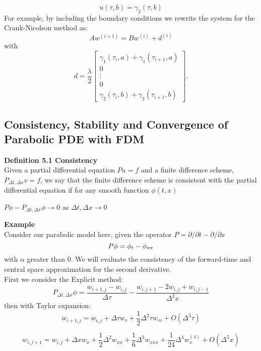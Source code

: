 \documentclass{article}
\begin{document}
$$
u(\tau, b) = \gamma_2(\tau, b)
$$
For example, by including the boundary conditions we rewrite the system for the Crank-Nicolson method as:
$$
Aw^{(i+1)} = Bw^{(i)} + d^{(i)}$$ with $$d = \frac{\lambda}{2}\begin{bmatrix}
\gamma_1(\tau_i,a)+\gamma_1(\tau_{i+1},a)\\ 
0\\ 
\vdots \\ 
0\\ 
\gamma_2(\tau_i,b)+\gamma_2(\tau_{i+1},b)
\end{bmatrix}.
$$
\subsection{Consistency, Stability and Convergence of Parabolic PDE with FDM}
\textbf{Definition 5.1 Consistency}\\
Given a partial differential equation $Pu = f$ and a finite difference scheme, $P_{\Delta t, \Delta x}v = f$, we say that the finite difference scheme is consistent with the partial differential equation if for any smooth function $\phi(t, x)$ 
\begin{center}
$ P\phi - P_{\Delta t, \Delta x}\phi \rightarrow 0 $ as $ \Delta t, \Delta x \rightarrow 0 $
\end{center}
\textbf{Example}\\
Consider our parabolic model here, given the operator $P = \partial /\partial t - \partial / \partial x$
$$
P\phi = \phi_t - \phi_{xx}\\
$$ 
with $\alpha$ greater than 0. We will evaluate the consistency of the forward-time and central space approximation for the second derivative.\\
First we consider the Explicit method:
$$
P_{\Delta t, \Delta x}\phi = \frac{w_{i+1,j} - w_{i,j}}{\Delta \tau} - \frac{w_{i,j+1} - 2w_{i,j} + w_{i,j-1}}{\Delta^2 x}
$$
then with Taylor expansion:
$$
w_{i+1,j} = w_{i,j} + \Delta \tau w_{\tau} + \frac{1}{2} \Delta^2 \tau w_{\tau \tau} + O(\Delta^3 \tau)
$$

$$
w_{i,j+1} = w_{i,j} + \Delta x w_x + \frac{1}{2} \Delta^2 w_{xx} + \frac{1}{6}\Delta^3 w_{xxx} + \frac{1}{24}\Delta^4 w^{(4)}_x + O(\Delta^5 x)
$$
\end{document}
